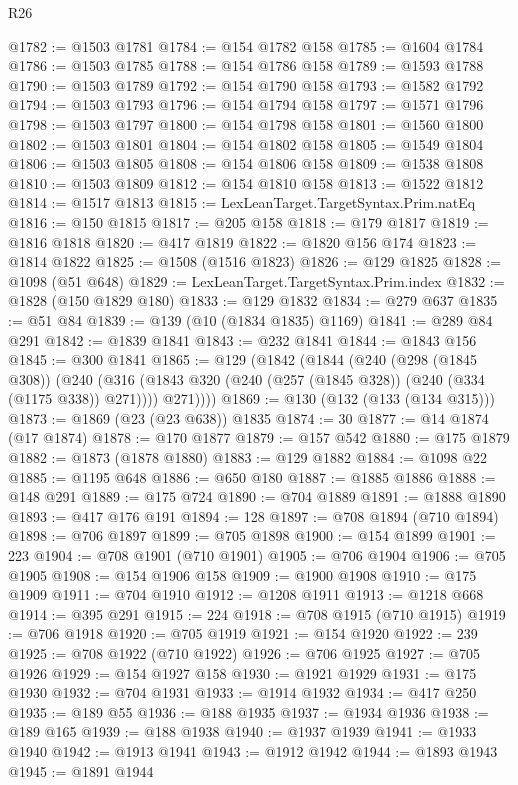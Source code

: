 \begin{lexlean}{R26}
\begin{coremodule}
@1782 := @1503 @1781
@1784 := @154 @1782 @158
@1785 := @1604 @1784
@1786 := @1503 @1785
@1788 := @154 @1786 @158
@1789 := @1593 @1788
@1790 := @1503 @1789
@1792 := @154 @1790 @158
@1793 := @1582 @1792
@1794 := @1503 @1793
@1796 := @154 @1794 @158
@1797 := @1571 @1796
@1798 := @1503 @1797
@1800 := @154 @1798 @158
@1801 := @1560 @1800
@1802 := @1503 @1801
@1804 := @154 @1802 @158
@1805 := @1549 @1804
@1806 := @1503 @1805
@1808 := @154 @1806 @158
@1809 := @1538 @1808
@1810 := @1503 @1809
@1812 := @154 @1810 @158
@1813 := @1522 @1812
@1814 := @1517 @1813
@1815 := LexLeanTarget.TargetSyntax.Prim.natEq
@1816 := @150 @1815
@1817 := @205 @158
@1818 := @179 @1817
@1819 := @1816 @1818
@1820 := @417 @1819
@1822 := @1820 @156 @174
@1823 := @1814 @1822
@1825 := @1508 (@1516 @1823)
@1826 := @129 @1825
@1828 := @1098 (@51 @648)
@1829 := LexLeanTarget.TargetSyntax.Prim.index
@1832 := @1828 (@150 @1829 @180)
@1833 := @129 @1832
@1834 := @279 @637
@1835 := @51 @84
@1839 := @139 (@10 (@1834 @1835) @1169)
@1841 := @289 @84 @291
@1842 := @1839 @1841
@1843 := @232 @1841
@1844 := @1843 @156
@1845 := @300 @1841
@1865 := @129
    (@1842
      (@1844
        (@240
          (@298 (@1845 @308))
          (@240
            (@316 (@1843 @320 (@240 (@257 (@1845 @328)) (@240 (@334 (@1175 @338)) @271))))
            @271))))
@1869 := @130 (@132 (@133 (@134 @315)))
@1873 := @1869 (@23 (@23 @638)) @1835
@1874 := 30
@1877 := @14 @1874 (@17 @1874)
@1878 := @170 @1877
@1879 := @157 @542
@1880 := @175 @1879
@1882 := @1873 (@1878 @1880)
@1883 := @129 @1882
@1884 := @1098 @22
@1885 := @1195 @648
@1886 := @650 @180
@1887 := @1885 @1886
@1888 := @148 @291
@1889 := @175 @724
@1890 := @704 @1889
@1891 := @1888 @1890
@1893 := @417 @176 @191
@1894 := 128
@1897 := @708 @1894 (@710 @1894)
@1898 := @706 @1897
@1899 := @705 @1898
@1900 := @154 @1899
@1901 := 223
@1904 := @708 @1901 (@710 @1901)
@1905 := @706 @1904
@1906 := @705 @1905
@1908 := @154 @1906 @158
@1909 := @1900 @1908
@1910 := @175 @1909
@1911 := @704 @1910
@1912 := @1208 @1911
@1913 := @1218 @668
@1914 := @395 @291
@1915 := 224
@1918 := @708 @1915 (@710 @1915)
@1919 := @706 @1918
@1920 := @705 @1919
@1921 := @154 @1920
@1922 := 239
@1925 := @708 @1922 (@710 @1922)
@1926 := @706 @1925
@1927 := @705 @1926
@1929 := @154 @1927 @158
@1930 := @1921 @1929
@1931 := @175 @1930
@1932 := @704 @1931
@1933 := @1914 @1932
@1934 := @417 @250
@1935 := @189 @55
@1936 := @188 @1935
@1937 := @1934 @1936
@1938 := @189 @165
@1939 := @188 @1938
@1940 := @1937 @1939
@1941 := @1933 @1940
@1942 := @1913 @1941
@1943 := @1912 @1942
@1944 := @1893 @1943
@1945 := @1891 @1944

\end{coremodule}
\end{lexlean}
